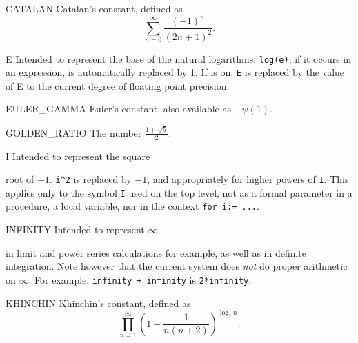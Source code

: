 \begin{list}{}{\renewcommand{\makelabel}[1]{\texttt{#1}\hspace{\fill}}%
               \setlength{\labelsep}{1em}%
               }

\item[CATALAN] Catalan's constant, defined as
  \begin{displaymath}
    \sum_{n=0}^{\infty} \frac{(-1)^{n}}{(2n+1)^{2}} .
  \end{displaymath}

\item[E] Intended to represent the base of
the natural logarithms.  \texttt{log(e)}, if it occurs in an expression, is
automatically replaced by 1.  If  is
on, \texttt{E} is replaced by the value of E to the current degree of
floating point precision.

\item[EULER\_GAMMA] Euler's constant, also available as $-\psi(1)$.

\item[GOLDEN\_RATIO] The number $\frac{1+\sqrt{5}}{2}$.

\item[I] Intended to represent the square

root of $-1$. \texttt{i\textasciicircum2} is replaced by $-1$, and
appropriately for higher powers of \texttt{I}.  This applies only to the
symbol \texttt{I} used on the top
level, not as a formal parameter in a procedure, a local variable, nor in
the context \texttt{for i:= ...}.

\item[INFINITY] Intended to represent $\infty$

in limit and power series calculations for example, as well as in definite integration.
Note however that the
current system does \emph{not} do proper arithmetic on $\infty$.  For example,
\texttt{infinity + infinity} is \texttt{2*infinity}.

\item[KHINCHIN] Khinchin's constant, defined as
  \begin{displaymath}
    \prod_{n=1}^{\infty}\left(1+\frac{1}{n(n+2)}\right)^{\log_{2} n} .
  \end{displaymath}


\end{list}
